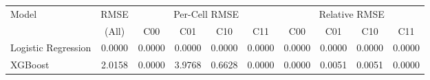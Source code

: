 \begin{tabular}{l c cccc cccc}
\toprule
Model & RMSE & \multicolumn{4}{c}{Per-Cell RMSE} & \multicolumn{4}{c}{Relative RMSE} \\
 & (All) & C00 & C01 & C10 & C11 & C00 & C01 & C10 & C11 \\
\midrule
Logistic Regression & 0.0000 & 0.0000 & 0.0000 & 0.0000 & 0.0000 & 0.0000 & 0.0000 & 0.0000 & 0.0000 \\
XGBoost & 2.0158 & 0.0000 & 3.9768 & 0.6628 & 0.0000 & 0.0000 & 0.0051 & 0.0051 & 0.0000 \\
\bottomrule
\end{tabular}
